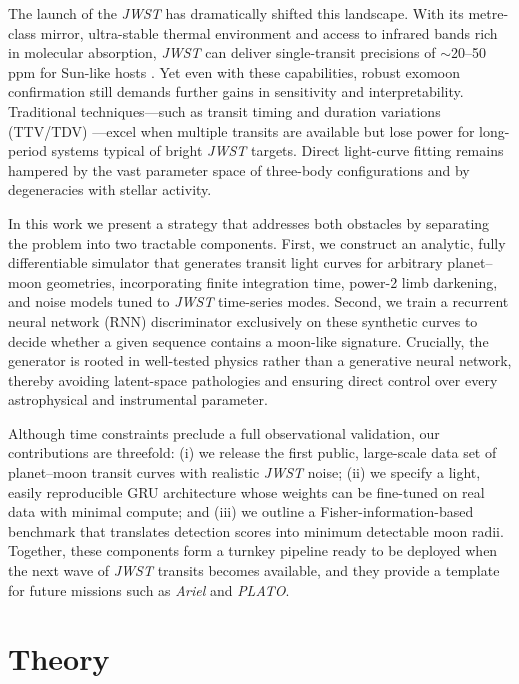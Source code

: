 \documentclass[11pt]{article}
\begin{document}
The launch of the \textit{JWST} has dramatically shifted this landscape.  With its metre-class mirror, ultra-stable thermal environment and access to infrared bands rich in molecular absorption, \textit{JWST} can deliver single-transit precisions of $\sim$20–50 ppm for Sun-like hosts \citep{Rustamkulov2024}.  Yet even with these capabilities, robust exomoon confirmation still demands further gains in sensitivity and interpretability.  Traditional techniques—such as transit timing and duration variations (TTV/TDV) \citep{Heller2014}—excel when multiple transits are available but lose power for long-period systems typical of bright \textit{JWST} targets.  Direct light-curve fitting remains hampered by the vast parameter space of three-body configurations and by degeneracies with stellar activity.

In this work we present a strategy that addresses both obstacles by separating the problem into two tractable components.  First, we construct an analytic, fully differentiable simulator that generates transit light curves for arbitrary planet–moon geometries, incorporating finite integration time, power-2 limb darkening, and noise models tuned to \textit{JWST} time-series modes.  Second, we train a recurrent neural network (RNN) discriminator exclusively on these synthetic curves to decide whether a given sequence contains a moon-like signature.  Crucially, the generator is rooted in well-tested physics rather than a generative neural network, thereby avoiding latent-space pathologies and ensuring direct control over every astrophysical and instrumental parameter.

Although time constraints preclude a full observational validation, our contributions are threefold: (i) we release the first public, large-scale data set of planet–moon transit curves with realistic \textit{JWST} noise; (ii) we specify a light, easily reproducible GRU architecture whose weights can be fine-tuned on real data with minimal compute; and (iii) we outline a Fisher-information-based benchmark that translates detection scores into minimum detectable moon radii.  Together, these components form a turnkey pipeline ready to be deployed when the next wave of \textit{JWST} transits becomes available, and they provide a template for future missions such as \textit{Ariel} and \textit{PLATO}.

\section{Theory}
\label{sec:theory}
\end{document}
